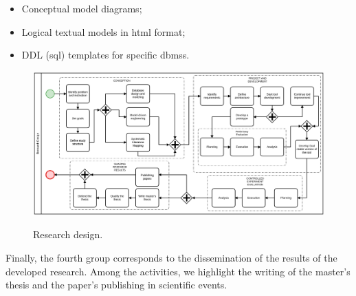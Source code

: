 
\begin{itemize}
     \item Conceptual model diagrams;
     \item Logical textual models in \ac{html} format;
     \item DDL (\ac{sql}) templates for specific \acp{dbms}.
\end{itemize}

\begin{figure}[!htb]
    \centering
    \caption{Research design.}
    \includegraphics[width=1\textwidth]{img/ResearchDesign.png}
    \label{fig:ResearchDesign}
\end{figure}

Finally, the fourth group corresponds to the dissemination of the results of the developed research.
Among the activities, we highlight the writing of the master's thesis and the paper's publishing in scientific events.


